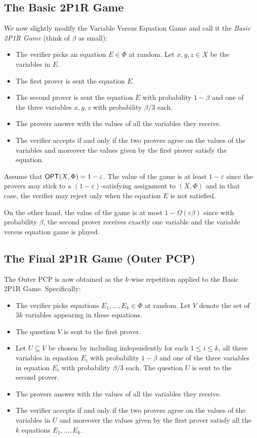 \documentclass[10pt]{article}
\theoremstyle{definition}
\numberwithin{equation}{section}
\DeclareMathOperator\OPT{{\sf OPT}}
\newcommand{\eps}{\varepsilon}
\begin{document}
\subsection{The Basic 2P1R Game}

We now slightly modify the Variable Versus Equation Game and call it the \emph{Basic 2P1R Game}
(think of $\beta$ as small):


\begin{itemize}
\item The verifier picks an equation $E \in \Phi$ at random. Let $x, y, z \in X$ be the variables in $E$.
\item The first prover is sent the equation $E$.
\item The second prover is sent the equation $E$ with probability $1-\beta$ and one of the three
variables $x,y, z$ with probability ${\beta}/{3}$ each.
\item The provers answer with the values of all the variables they receive.
\item The verifier accepts if and only if the two provers agree on the
      values of the variables and moreover the values given by the first prover
      satisfy the equation.
\end{itemize}

Assume that $\OPT(X,\Phi) = 1-\eps$.  The value of the game is at least $1-\eps$ since the provers
may stick to a $(1-\eps)$-satisfying assignment to $(X,\Phi)$ and in that case, the verifier may reject only
when the equation $E$ is not satisfied.

On the other hand, the value of the game is at most
$1-\Omega(\eps \beta)$ since with probability $\beta$, the second prover receives exactly one
variable and the variable versus equation game is played.

\subsection{The Final 2P1R Game (Outer PCP)}

The Outer PCP is now obtained as the $k$-wise repetition applied to the Basic 2P1R Game. Specifically:

\begin{itemize}
\item The verifier picks equations $E_1,\ldots,E_k \in \Phi$ at random. Let $V$ denote the set of $3k$ variables appearing in these equations.
\item The question $V$ is sent to the first prover.
\item Let $U \subseteq V$ be chosen by including independently for each $1 \leq i \leq k$, all three variables in equation $E_i$ with probability $1-\beta$ and one of the three variables in equation
    $E_i$ with probability ${\beta}/{3}$ each. The question $U$ is sent to the second prover.
\item The provers answer with the values of all the variables they receive.
\item The verifier accepts if and only if the two provers agree on the
      values of the variables in $U$ and moreover the values given by the first prover
      satisfy all the $k$ equations $E_1, \ldots, E_k$.
\end{itemize}
\end{document}

